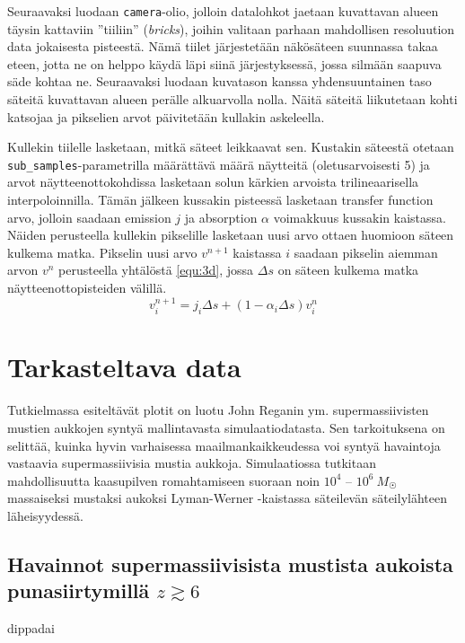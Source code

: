 \documentclass[12pt,a4paper]{article}
\begin{document}
Seuraavaksi luodaan \texttt{camera}-olio, jolloin datalohkot jaetaan kuvattavan alueen täysin kattaviin ''tiiliin'' (\textit{bricks}), joihin valitaan parhaan mahdollisen resoluution data jokaisesta pisteestä. Nämä tiilet järjestetään näkösäteen suunnassa takaa eteen, jotta ne on helppo käydä läpi siinä järjestyksessä, jossa silmään saapuva säde kohtaa ne. Seuraavaksi luodaan kuvatason kanssa yhdensuuntainen taso säteitä kuvattavan alueen perälle alkuarvolla nolla. Näitä säteitä liikutetaan kohti katsojaa ja pikselien arvot päivitetään kullakin askeleella. \cite{volume}

\begin{sloppypar}
Kullekin tiilelle lasketaan, mitkä säteet leikkaavat sen. Kustakin säteestä otetaan \texttt{sub\_samples}-parametrilla määrättävä määrä näytteitä (oletusarvoisesti 5) ja arvot näytteenottokohdissa lasketaan solun kärkien arvoista trilineaarisella interpoloinnilla. Tämän jälkeen kussakin pisteessä lasketaan transfer function arvo, jolloin saadaan emission $j$ ja absorption $\alpha$ voimakkuus kussakin kaistassa. Näiden perusteella kullekin pikselille lasketaan uusi arvo ottaen huomioon säteen kulkema matka. Pikselin uusi arvo $v^{n+1}$ kaistassa $i$ saadaan pikselin aiemman arvon $v^n$ perusteella yhtälöstä \ref{equ:3d}, jossa $\Delta s$ on säteen kulkema matka näytteenottopisteiden välillä.
\begin{equation}\label{equ:3d}
v^{n+1}_{i} =  j_{i}\Delta s + (1 - \alpha_{i}\Delta s )v^{n}_{i}
\end{equation}
\end{sloppypar}


\section{Tarkasteltava data}
Tutkielmassa esiteltävät plotit on luotu John Reganin ym. \cite{rj} supermassiivisten mustien aukkojen syntyä mallintavasta simulaatiodatasta. Sen tarkoituksena on selittää, kuinka hyvin varhaisessa maailmankaikkeudessa voi syntyä havaintoja vastaavia supermassiivisia mustia aukkoja. Simulaatiossa tutkitaan mahdollisuutta kaasupilven romahtamiseen suoraan noin $10^4$ -- $10^6~ M_{\astrosun}$ massaiseksi mustaksi aukoksi Lyman-Werner -kaistassa säteilevän säteilylähteen läheisyydessä. \cite{rj}

\subsection{Havainnot supermassiivisista mustista aukoista punasiirtymillä $z \gtrsim 6$}
dippadai \cite{fan, mortlock, venemans}
\end{document}
